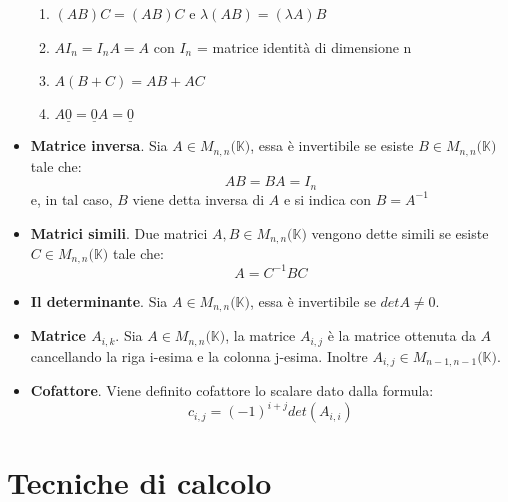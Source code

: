 \documentclass[12pt,a4paper,oneside]{book}
\begin{document}
\begin{itemize}
	  \begin{enumerate}
	  \item $(AB)C = (AB)C$ e $\lambda(AB) = (\lambda A)B$
	  \item $AI_n  = I_nA = A$ con $I_n$ = matrice identità di dimensione n
	  \item $A(B+C) = AB + AC$
	  \item $A\underline{0}=\underline{0}A=\underline{0}$
	  \end{enumerate}
	
\item \textbf{Matrice inversa}. \linebreak
	  Sia $A \in M_{n,n}(\mathbb{K)}$, essa è invertibile se esiste $B\in M_{n,n}(\mathbb{K)}$ tale che:
	  $$AB=BA=I_n$$
	  e, in tal caso, $B$ viene detta inversa di $A$ e si indica con $B=A^{-1}$
	
\item \textbf{Matrici simili}. \linebreak
	  Due matrici $A,B \in M_{n,n}(\mathbb{K)}$ vengono dette simili se esiste $C\in M_{n,n}(\mathbb{K)}$
	  tale che: $$A=C^{-1}BC$$
	
\item \textbf{Il determinante}. \linebreak
	  Sia $A \in M_{n,n}(\mathbb{K)}$, essa è invertibile se $detA \neq 0$.
	
\item \textbf{Matrice $A_{i, k}$}.
	  Sia $A \in M_{n,n}(\mathbb{K)}$, la matrice $A_{i, j}$ è la matrice ottenuta da $A$ cancellando la 
	  riga i-esima e la colonna j-esima. Inoltre $A_{i, j} \in M_{n-1,n-1}(\mathbb{K)}$.
	
\item \textbf{Cofattore}.
	  Viene definito cofattore lo scalare dato dalla formula: $$c_{i, j} = (-1)^{i+j}det(A_{i, i})$$
	


\end{itemize}

\newpage

			  \section{Tecniche di calcolo}
			   
\end{document}
